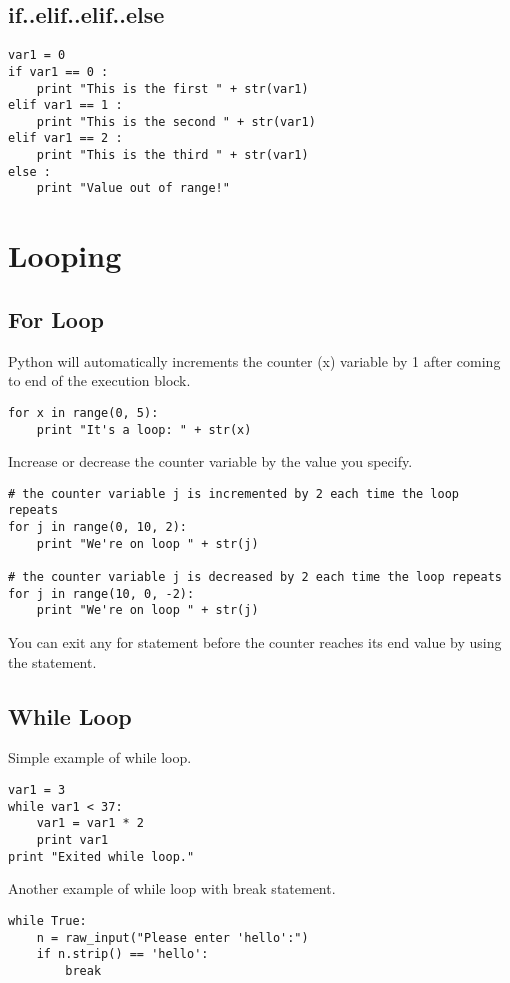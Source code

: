 \documentclass[a4paper,9pt]{extarticle}
\begin{document}
\begin{multicols*}{2}
\subsection{if..elif..elif..else}
\begin{lstlisting}
var1 = 0
if var1 == 0 :
    print "This is the first " + str(var1)
elif var1 == 1 :
    print "This is the second " + str(var1)
elif var1 == 2 :
    print "This is the third " + str(var1)
else :
    print "Value out of range!"
\end{lstlisting}


\section{Looping}

\subsection{For Loop}
Python will automatically increments the counter (x) variable by 1 after coming to end of the execution block.
\begin{lstlisting}
for x in range(0, 5):
    print "It's a loop: " + str(x)
\end{lstlisting}

Increase or decrease the counter variable by the value you specify.
\begin{lstlisting}
# the counter variable j is incremented by 2 each time the loop repeats
for j in range(0, 10, 2):
    print "We're on loop " + str(j)

# the counter variable j is decreased by 2 each time the loop repeats
for j in range(10, 0, -2):
    print "We're on loop " + str(j)
\end{lstlisting}

You can exit any for statement before the counter reaches its end value by using the  statement.

\subsection{While Loop}
Simple example of while loop.
\begin{lstlisting}
var1 = 3
while var1 < 37:
    var1 = var1 * 2
    print var1
print "Exited while loop."
\end{lstlisting}

Another example of while loop with break statement.
\begin{lstlisting}
while True:
    n = raw_input("Please enter 'hello':")
    if n.strip() == 'hello':
        break
\end{lstlisting}



\end{multicols*}
\end{document}
